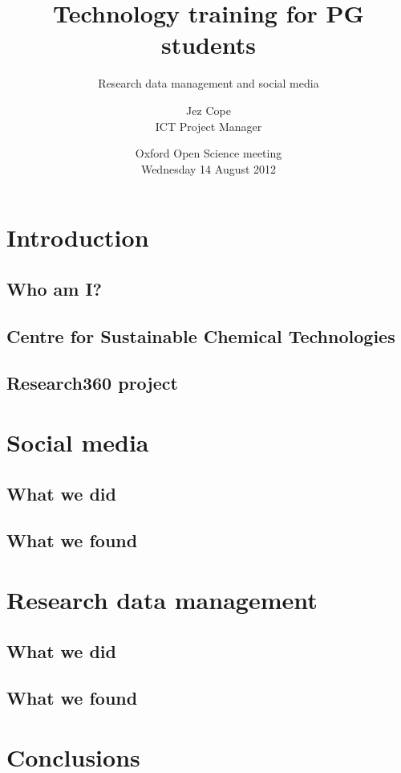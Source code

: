 \documentclass{beamer}
\title{Technology training for PG students}
\subtitle{Research data management and social media}
\author[Jez Cope]{Jez Cope\\ ICT Project Manager}
\institute[Bath]{Centre for Sustainable Chemical Technologies\\ University of Bath}
\date[14 August 2012]{Oxford Open Science meeting\\ Wednesday 14 August 2012}
\begin{document}

\begin{frame}[plain]
  \titlepage
\end{frame}

\begin{frame}
  \tableofcontents
\end{frame}

\section{Introduction}

\subsection{Who am I?}

\subsection{Centre for Sustainable Chemical Technologies}

\subsection{Research360 project}

\section{Social media}

\subsection{What we did}

\subsection{What we found}

\section{Research data management}

\subsection{What we did}

\subsection{What we found}

\section{Conclusions}

\begin{frame}
\end{frame}
\end{document}
